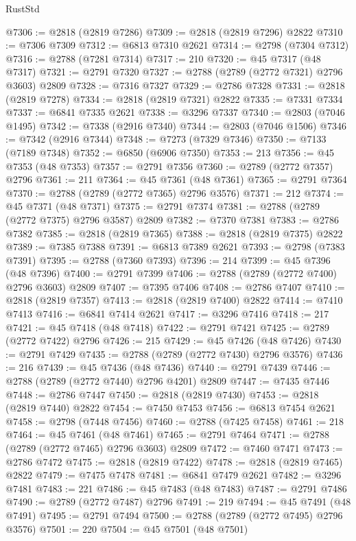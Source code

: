 \begin{lexlean}{RustStd}
\begin{coremodule}
@7306 := @2818 (@2819 @7286)
@7309 := @2818 (@2819 @7296) @2822
@7310 := @7306 @7309
@7312 := @6813 @7310 @2621
@7314 := @2798 (@7304 @7312)
@7316 := @2788 (@7281 @7314)
@7317 := 210
@7320 := @45 @7317 (@48 @7317)
@7321 := @2791 @7320
@7327 := @2788 (@2789 (@2772 @7321) @2796 @3603) @2809
@7328 := @7316 @7327
@7329 := @2786 @7328
@7331 := @2818 (@2819 @7278)
@7334 := @2818 (@2819 @7321) @2822
@7335 := @7331 @7334
@7337 := @6841 @7335 @2621
@7338 := @3296 @7337
@7340 := @2803 (@7046 @1495)
@7342 := @7338 (@2916 @7340)
@7344 := @2803 (@7046 @1506)
@7346 := @7342 (@2916 @7344)
@7348 := @7273 (@7329 @7346)
@7350 := @7133 (@7189 @7348)
@7352 := @6850 (@6906 @7350)
@7353 := 213
@7356 := @45 @7353 (@48 @7353)
@7357 := @2791 @7356
@7360 := @2789 (@2772 @7357) @2796
@7361 := 211
@7364 := @45 @7361 (@48 @7361)
@7365 := @2791 @7364
@7370 := @2788 (@2789 (@2772 @7365) @2796 @3576)
@7371 := 212
@7374 := @45 @7371 (@48 @7371)
@7375 := @2791 @7374
@7381 := @2788 (@2789 (@2772 @7375) @2796 @3587) @2809
@7382 := @7370 @7381
@7383 := @2786 @7382
@7385 := @2818 (@2819 @7365)
@7388 := @2818 (@2819 @7375) @2822
@7389 := @7385 @7388
@7391 := @6813 @7389 @2621
@7393 := @2798 (@7383 @7391)
@7395 := @2788 (@7360 @7393)
@7396 := 214
@7399 := @45 @7396 (@48 @7396)
@7400 := @2791 @7399
@7406 := @2788 (@2789 (@2772 @7400) @2796 @3603) @2809
@7407 := @7395 @7406
@7408 := @2786 @7407
@7410 := @2818 (@2819 @7357)
@7413 := @2818 (@2819 @7400) @2822
@7414 := @7410 @7413
@7416 := @6841 @7414 @2621
@7417 := @3296 @7416
@7418 := 217
@7421 := @45 @7418 (@48 @7418)
@7422 := @2791 @7421
@7425 := @2789 (@2772 @7422) @2796
@7426 := 215
@7429 := @45 @7426 (@48 @7426)
@7430 := @2791 @7429
@7435 := @2788 (@2789 (@2772 @7430) @2796 @3576)
@7436 := 216
@7439 := @45 @7436 (@48 @7436)
@7440 := @2791 @7439
@7446 := @2788 (@2789 (@2772 @7440) @2796 @4201) @2809
@7447 := @7435 @7446
@7448 := @2786 @7447
@7450 := @2818 (@2819 @7430)
@7453 := @2818 (@2819 @7440) @2822
@7454 := @7450 @7453
@7456 := @6813 @7454 @2621
@7458 := @2798 (@7448 @7456)
@7460 := @2788 (@7425 @7458)
@7461 := 218
@7464 := @45 @7461 (@48 @7461)
@7465 := @2791 @7464
@7471 := @2788 (@2789 (@2772 @7465) @2796 @3603) @2809
@7472 := @7460 @7471
@7473 := @2786 @7472
@7475 := @2818 (@2819 @7422)
@7478 := @2818 (@2819 @7465) @2822
@7479 := @7475 @7478
@7481 := @6841 @7479 @2621
@7482 := @3296 @7481
@7483 := 221
@7486 := @45 @7483 (@48 @7483)
@7487 := @2791 @7486
@7490 := @2789 (@2772 @7487) @2796
@7491 := 219
@7494 := @45 @7491 (@48 @7491)
@7495 := @2791 @7494
@7500 := @2788 (@2789 (@2772 @7495) @2796 @3576)
@7501 := 220
@7504 := @45 @7501 (@48 @7501)

\end{coremodule}
\end{lexlean}
